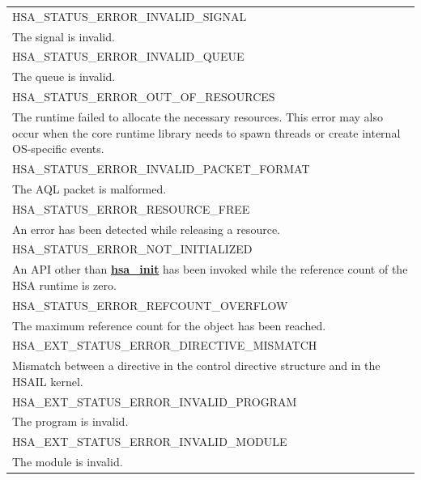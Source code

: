\documentclass[final,oneside]{book}
\newcommand{\reffun}[1]{\textbf{#1}}
\newcommand{\reftyp}[1]{#1}
\newcommand{\refenu}[1]{\reftyp{#1}}
\begin{document}
\begin{longtable}{@{\hspace{2em}}p{\linewidth-2em}}
\hspace{-2em}\refenu{HSA_\-STATUS_\-ERROR_\-INVALID_\-SIGNAL}\\The signal is invalid.\\[2mm]
\hspace{-2em}\refenu{HSA_\-STATUS_\-ERROR_\-INVALID_\-QUEUE}\\The queue is invalid.\\[2mm]
\hspace{-2em}\refenu{HSA_\-STATUS_\-ERROR_\-OUT_\-OF_\-RESOURCES}\\The runtime failed to allocate the necessary resources. This error may also occur when the core runtime library needs to spawn threads or create internal OS-specific events.\\[2mm]
\hspace{-2em}\refenu{HSA_\-STATUS_\-ERROR_\-INVALID_\-PACKET_\-FORMAT}\\The AQL packet is malformed.\\[2mm]
\hspace{-2em}\refenu{HSA_\-STATUS_\-ERROR_\-RESOURCE_\-FREE}\\An error has been detected while releasing a resource.\\[2mm]
\hspace{-2em}\refenu{HSA_\-STATUS_\-ERROR_\-NOT_\-INITIALIZED}\\An API other than \hyperlink{group__initshutdown_1ga5b8574433e7dbcbd31ea397a02e3c32b}{\reffun{hsa_\-init}} has been invoked while the reference count of the HSA runtime is zero.\\[2mm]
\hspace{-2em}\refenu{HSA_\-STATUS_\-ERROR_\-REFCOUNT_\-OVERFLOW}\\The maximum reference count for the object has been reached.\\[2mm]
\hspace{-2em}\refenu{HSA_\-EXT_\-STATUS_\-ERROR_\-DIRECTIVE_\-MISMATCH}\\Mismatch between a directive in the control directive structure and in the HSAIL kernel.\\[2mm]
\hspace{-2em}\refenu{HSA_\-EXT_\-STATUS_\-ERROR_\-INVALID_\-PROGRAM}\\The program is invalid.\\[2mm]
\hspace{-2em}\refenu{HSA_\-EXT_\-STATUS_\-ERROR_\-INVALID_\-MODULE}\\The module is invalid.\\[2mm]

\end{longtable}
\end{document}
